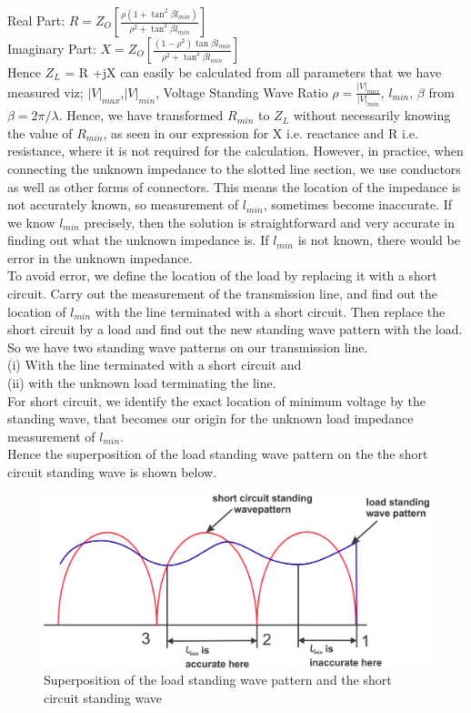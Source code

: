 Real Part: $R = Z_{O}[\frac{\rho (1 + \tan^{2}\beta l_{min})}{\rho^{2} + \tan^{2}\beta l_{min}}]$\\

Imaginary Part: $ X = Z_{O}[\frac{(1-\rho^{2})\tan\beta l_{min}}{\rho^{2} + \tan^{2}\beta l_{min}}]  $\\

Hence $Z_{L}$ = R +jX can easily be calculated from all parameters that we have measured viz; $|V|_{max}$,$|V|_{min}$, Voltage Standing Wave Ratio $\rho = \frac{|V|_{max}}{|V|_{min}}$, $l_{min}$, $\beta$ from $\beta = 2\pi/\lambda$. Hence, we have transformed $R_{min}$ to $Z_{L}$ without necessarily knowing the value of $R_{min}$, as seen in our expression for X i.e. reactance and R i.e. resistance, where it is not required for the calculation. 
However, in practice, when connecting the unknown impedance to the slotted line section, we use conductors as well as other forms of connectors. This means the location of the impedance is not accurately known, so measurement of $l_{min}$, sometimes become inaccurate. If we know $l_{min}$ precisely, then the solution is straightforward and very accurate in finding out what the unknown impedance is. If $l_{min}$ is not known, there would be error in the unknown impedance.\\

To avoid error, we define the location of the load by replacing it with a short circuit. Carry out the measurement of the transmission line, and find out the location of $l_{min}$ with the line terminated with a short circuit. Then replace the short circuit by a load and find out the new standing wave pattern with the load. So we have two standing wave patterns on our transmission line. \\(i) With the line terminated with a short circuit and \\(ii) with the unknown load terminating the line.\\ For short circuit, we identify the exact location of minimum voltage by the standing wave, that becomes our origin for the unknown load impedance measurement of $l_{min}$.\\

Hence the superposition of the load standing wave pattern on the the short circuit standing wave is shown below.
\begin{figure}[h]
\centering
\includegraphics[width=1\linewidth]{./graphics/group10diagram2}
\caption{Superposition of the load standing wave pattern and the short circuit standing wave}
\end{figure}

